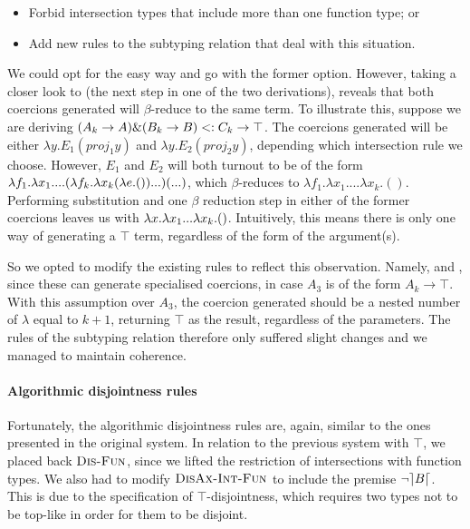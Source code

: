 \begin{itemize}
\item Forbid intersection types that include more than one function type; or
\item Add new rules to the subtyping relation that deal with this situation. 
\end{itemize}

We could opt for the easy way and go with the former option.
However, taking a closer look to  (the next step in one of the two derivations), reveals that both coercions generated will $\beta$-reduce to the same term. 
To illustrate this, suppose we are deriving $(A_k \to A) \& (B_k \to B) <: C_k \to \top$.
The coercions generated will be either $\lambda y. E_1 (proj_1 y)$ and $\lambda y. E_2 (proj_2 y)$, depending which intersection rule we choose.
However, $E_1$ and $E_2$ will both turnout to be of the form $\lambda f_1. \lambda x_1. ... (\lambda f_k. \lambda x_k (\lambda e. ())...) (...)$, which $\beta$-reduces to $\lambda f_1. \lambda x_1. ... \lambda x_k. ()$.
Performing substitution and one $\beta$ reduction step in either of the former 
coercions leaves us with 
$\lambda x. \lambda x_1... \lambda x_k. ()$.
Intuitively, this means there is only one way of generating a $\top$ term, regardless of the form of the argument(s).

So we opted to modify the existing rules to reflect this observation.
Namely,  and , since these can generate specialised coercions,
in case $A_3$ is of the form $A_k \to \top$. 
With this assumption over $A_3$, the coercion generated should be a nested number of $\lambda$ equal to $k+1$,
returning $\top$ as the result, regardless of the parameters.
The rules of the subtyping relation therefore only suffered slight changes and we managed to maintain coherence.

\paragraph{Algorithmic disjointness rules}

Fortunately, the algorithmic disjointness rules are, again, similar to the ones presented in the original system.
In relation to the previous system with $\top$, we placed back $\textsc{Dis-Fun}$, since we lifted the restriction
of intersections with function types.
We also had to modify $\textsc{DisAx-Int-Fun}$ to include the premise $\neg \rceil B \lceil$.
This is due to the specification of $\top$-disjointness, which requires two types not to be top-like in order for them to 
be disjoint.


